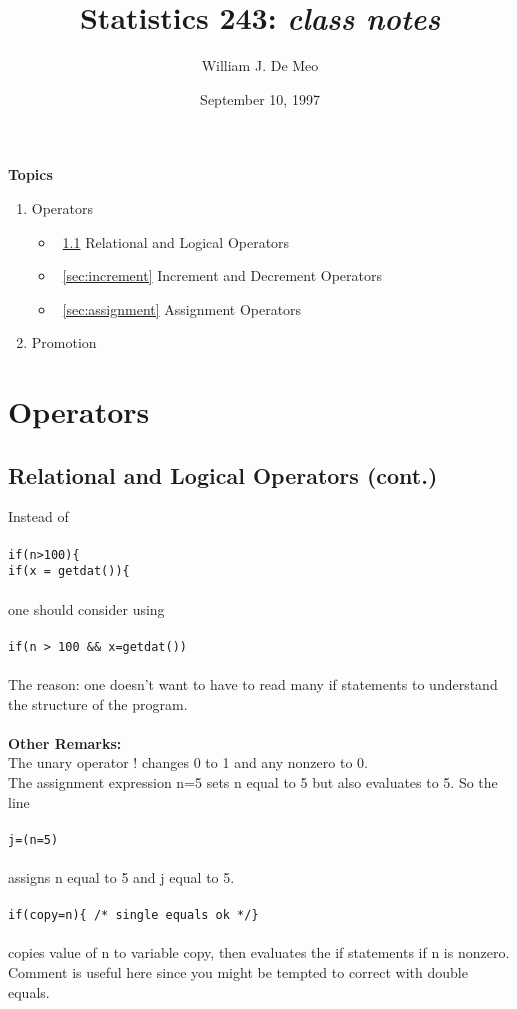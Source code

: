 \documentclass{article}
\begin{document}
\title{Statistics 243: \emph{class notes}}
\author{William J. De Meo}
\date{September 10, 1997}
\maketitle

{\bf Topics}\\
\begin{enumerate}
\item Operators
\begin{itemize}
\item ~\ref{sec:relational} Relational and Logical Operators
\item ~\ref{sec:increment} Increment and Decrement Operators
\item ~\ref{sec:assignment} Assignment Operators
\end{itemize}
\item Promotion

\end{enumerate}

\section{Operators}
\subsection{Relational and Logical Operators (cont.)}
\label{sec:relational}

Instead of \\\\
{\tt if(n>100)\{\\
\indent if(x = getdat())\{}
\\\\
one should consider using \\\\
{\tt if(n > 100 \&\& x=getdat()) }\\\\
The reason: one doesn't want to have to read many if statements 
to understand the structure of the program.\\\\
{\bf Other Remarks:}\\
The unary operator ! changes 0 to 1 and any nonzero to 0.\\
The assignment expression n=5 sets n equal to 5 but also evaluates to 5.  So 
the line\\\\
{\tt j=(n=5)}\\\\
assigns n equal to 5 and j equal to 5.\\\\
{\tt if(copy=n)\{ /* single equals ok */\}}\\\\
copies value of n to variable copy, then evaluates the if statements
if n is nonzero.  Comment is useful here since you might be tempted 
to correct with double equals.
\end{document}
